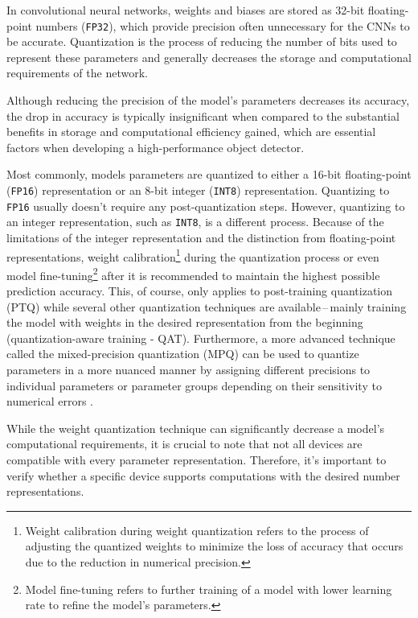 In convolutional neural networks, weights and biases are stored as 32-bit
floating-point numbers (\texttt{FP32}), which provide precision often
unnecessary for the CNNs to be accurate. Quantization is the process of reducing
the number of bits used to represent these parameters and generally decreases
the storage and computational requirements of the network.

Although reducing the precision of the model's parameters decreases its
accuracy, the drop in accuracy is typically insignificant when compared to the
substantial benefits in storage and computational efficiency gained, which are
essential factors when developing a high-performance object detector.

Most commonly, models parameters are quantized to either a 16-bit floating-point
(\texttt{FP16}) representation or an 8-bit integer (\texttt{INT8})
representation. Quantizing to \texttt{FP16} usually doesn't require any
post-quantization steps. However, quantizing to an integer representation, such
as \texttt{INT8}, is a different process. Because of the limitations of the
integer representation and the distinction from floating-point representations,
weight calibration\footnote{Weight calibration during weight quantization refers
to the process of adjusting the quantized weights to minimize the loss of
accuracy that occurs due to the reduction in numerical precision.} during the
quantization process or even model fine-tuning\footnote{Model fine-tuning refers
to further training of a model with lower learning rate to refine the model's
parameters.} after it is recommended to maintain the highest possible prediction
accuracy. This, of course, only applies to post-training quantization (PTQ) while
several other quantization techniques are available\,--\,mainly training the
model with weights in the desired representation from the beginning (quantization-aware training - QAT).
Furthermore, a more advanced technique called the mixed-precision quantization
(MPQ) can be used to quantize parameters in a more nuanced manner by assigning
different precisions to individual parameters or parameter groups depending on
their sensitivity to numerical errors \cite{Tang2022}.

While the weight quantization technique can significantly decrease a model's
computational requirements, it is crucial to note that not all devices are
compatible with every parameter representation. Therefore, it's important to
verify whether a specific device supports computations with the desired number
representations.

